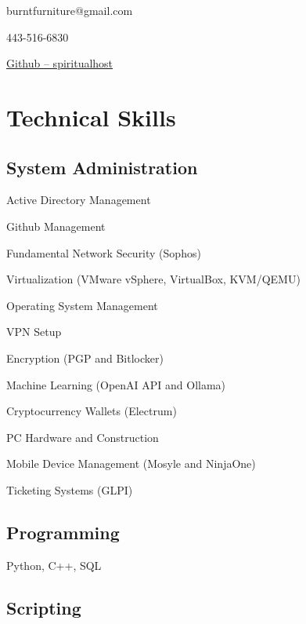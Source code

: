 \documentclass{article}
\makeatletter
\renewcommand{\maketitle}{
	\begin{center}
		{\huge\bfseries\theauthor}
		
		\vspace{.5em}

		burntfurniture@gmail.com

		443-516-6830

		\href{https://github.com/spiritualhost}{Github -- spiritualhost}
	\end{center}
}
\makeatother
\begin{document}
\noindent

\author{Ryan Piazza}

\maketitle

\section{Technical Skills}

\subsection{System Administration}
\vspace{-1em} %

\begin{multicols}{2}
	\begin{compactitem}
		\item Active Directory Management
		\item Github Management
		\item Fundamental Network Security (Sophos)
		\item Virtualization (VMware vSphere, VirtualBox, KVM/QEMU)
		\item Operating System Management
		\item VPN Setup
		\item Encryption (PGP and Bitlocker)
		\item Machine Learning (OpenAI API and Ollama)
		\item Cryptocurrency Wallets (Electrum)
		\item PC Hardware and Construction
		\item Mobile Device Management (Mosyle and NinjaOne)
		\item Ticketing Systems (GLPI)
	\end{compactitem}
\end{multicols}

\subsection{Programming}

Python, C++, SQL

\subsection{Scripting} 
\end{document}
